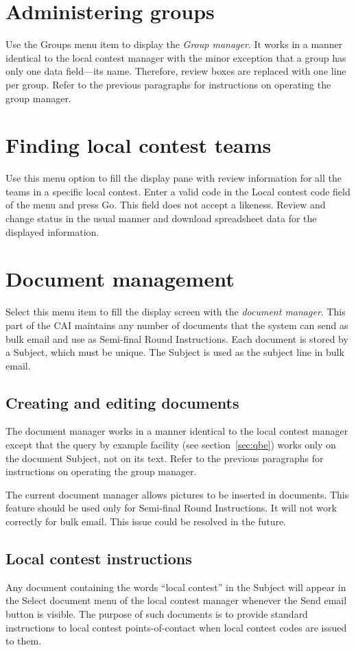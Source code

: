 \documentclass[11pt,letterpaper]{refart}
\def\ui#1{\textsf{#1}}
\begin{document}
\section{Administering groups}
Use the \ui{Groups} menu item to display the \emph{Group manager}. It 
works in a manner identical to the local contest manager with the minor 
exception that a group has only one data field---its name. Therefore,
review boxes are replaced with one line per group. Refer to the previous
paragraphs for instructions on operating the group manager.

\section{Finding local contest teams}
Use this menu option to fill the display pane with review information for all the
teams in a specific local contest. 
Enter a valid code in the \ui{Local contest code} field of the menu
and press \ui{Go}. This field does not accept a likeness.
Review and change status in the usual 
manner and download spreadsheet data for the displayed information.

\section{Document management}
\label{sec:documentmanagement}
Select this menu item to fill the display screen with the \emph{document 
manager}. This part of the CAI maintains any number of documents that 
the system can send as bulk email and use as Semi-final Round Instructions.
Each document is stored by a Subject, which must be unique. The Subject
is used as the subject line in bulk email.

\subsection{Creating and editing documents}
The document manager works in a manner identical to the local contest
manager except that the query by example facility (see section~\ref{sec:qbe})
works only on the document Subject, not on its text. Refer to the previous
paragraphs for instructions on operating the group manager.

The current document manager allows pictures to be inserted in documents.
This feature should be used only for Semi-final Round Instructions. It will
not work correctly for bulk email. This issue could be resolved in the future.

\subsection{Local contest instructions}
Any document containing the words ``local contest'' in the Subject will appear
in the \ui{Select document} menu of the local contest manager whenever 
the \ui{Send email} button is visible. The purpose of such documents is to
provide standard instructions to local contest points-of-contact when local
contest codes are issued to them. 
\end{document}
